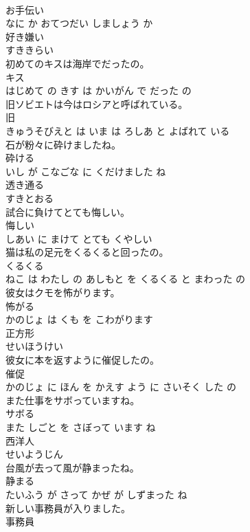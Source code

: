 \documentclass[8pt]{extreport}
\begin{document}
\begin{CJK}{UTF8}{min}
\\	お手伝い 
\\	なに か おてつだい しましょう か			
\\	好き嫌い	
\\	すききらい		
\\	初めてのキスは海岸でだったの。	
\\	キス 
\\	はじめて の きす は かいがん で だった の			
\\	旧ソビエトは今はロシアと呼ばれている。	
\\	旧 
\\	きゅうそびえと は いま は ろしあ と よばれて いる			
\\	石が粉々に砕けましたね。	
\\	砕ける 
\\	いし が こなごな に くだけました ね			
\\	透き通る	
\\	すきとおる		
\\	試合に負けてとても悔しい。	
\\	悔しい 
\\	しあい に まけて とても くやしい			
\\	猫は私の足元をくるくると回ったの。	
\\	くるくる 
\\	ねこ は わたし の あしもと を くるくる と まわった の			
\\	彼女はクモを怖がります。	
\\	怖がる 
\\	かのじょ は くも を こわがります			
\\	正方形	
\\	せいほうけい		
\\	彼女に本を返すように催促したの。	
\\	催促 
\\	かのじょ に ほん を かえす よう に さいそく した の			
\\	また仕事をサボっていますね。	
\\	サボる 
\\	また しごと を さぼって います ね			
\\	西洋人	
\\	せいようじん		
\\	台風が去って風が静まったね。	
\\	静まる 
\\	たいふう が さって かぜ が しずまった ね			
\\	新しい事務員が入りました。	
\\	事務員 

\end{CJK}
\end{document}
